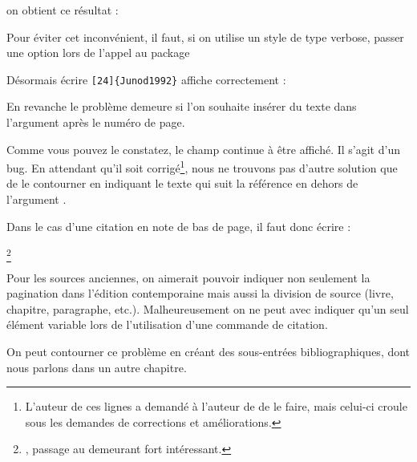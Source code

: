 on obtient ce résultat :

\begin{quotation}
\end{quotation}



Pour éviter cet inconvénient, il faut, si on utilise un style de type verbose, passer une option lors de l'appel au package 

\begin{latexcode}
\usepackage[citestyle=verbose,citepages=omit]{biblatex}
\end{latexcode}

Désormais écrire \verb|[24]{Junod1992}|
affiche correctement :

\begin{quotation}
\cite[24]{Junod1992}
\end{quotation}

En revanche le problème demeure si l'on souhaite insérer du texte dans l'argument  après le numéro de page.

\begin{latexcode}
\cite[\pno~24, passage au demeurant fort intéressant.]{Junod1992}
\end{latexcode}

\begin{quotation}
\cite[\pno~24, passage au demeurant fort intéressant.]{Junod1992}
\end{quotation}

Comme vous pouvez le constatez, le champ  continue à être affiché. Il s'agit d'un bug. En attendant qu'il soit corrigé\footnote{L'auteur de ces lignes a demandé à l'auteur de  de le faire, mais celui-ci croule sous les demandes de corrections et améliorations.}, nous ne trouvons pas d'autre solution que de le contourner en indiquant le texte qui suit la référence en dehors de l'argument . 

Dans le cas d'une citation en note de bas de page, il faut donc écrire :

\begin{latexcode}
\footnote{\cite[24]{Junod1992}, passage au demeurant fort intéressant.}
\end{latexcode}

\begin{attention}
Pour les sources anciennes, on aimerait pouvoir indiquer non seulement la pagination dans l'édition contemporaine mais aussi la division de source (livre, chapitre, paragraphe, etc.). Malheureusement on ne peut avec  indiquer qu'un seul élément variable lors de l'utilisation d'une commande de citation.

On peut contourner ce problème en créant des sous-entrées bibliogra\-phiques, dont nous parlons dans un autre chapitre. 
\end{attention}

